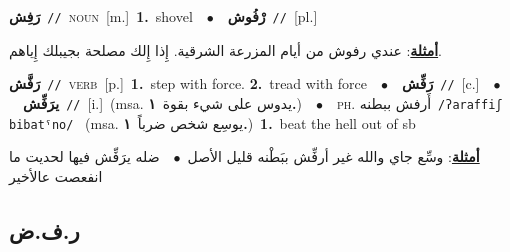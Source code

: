 \documentclass[10pt,a4paper,twoside]{article} %
\begin{document}
\begin{multicols}{2}
{\setlength\topsep{0pt}\textbf{\foreignlanguage{arabic}{رَفِش}}\ {\color{gray}\texttt{//}\color{black}}\ \textsc{noun}\ [m.]\ \textbf{1.}~shovel\ \ $\bullet$\ \ \setlength\topsep{0pt}\textbf{\foreignlanguage{arabic}{رْفُوش}}\ {\color{gray}\texttt{//}\color{black}}\ [pl.]\  \begin{flushright}\color{gray}\foreignlanguage{arabic}{\textbf{\underline{\foreignlanguage{arabic}{أمثلة}}}: عندي رفوش من أيام المزرعة الشرقية. إِذا إِلك مصلحة بجيبلك إِياهم.}\end{flushright}\color{black}} \vspace{2mm}

{\setlength\topsep{0pt}\textbf{\foreignlanguage{arabic}{رَفَّش}}\ {\color{gray}\texttt{//}\color{black}}\ \textsc{verb}\ [p.]\ \textbf{1.}~step with force.  \textbf{2.}~tread with force\ \ $\bullet$\ \ \setlength\topsep{0pt}\textbf{\foreignlanguage{arabic}{رَفِّش}}\ {\color{gray}\texttt{//}\color{black}}\ [c.]\ \ $\bullet$\ \ \setlength\topsep{0pt}\textbf{\foreignlanguage{arabic}{يرَفِّش}}\ {\color{gray}\texttt{//}\color{black}}\ [i.]\ \color{gray}(msa. \foreignlanguage{arabic}{يدوس على شيء بقوة}~\foreignlanguage{arabic}{\textbf{١.}})\color{black}\ \ $\bullet$\ \ \textsc{ph.} \color{gray} \foreignlanguage{arabic}{أَرفش ببطنه}\color{black}\ {\color{gray}\texttt{/{\sffamily ʔaraffiʃ bibatˤno}/}\color{black}}\ \color{gray} (msa. \foreignlanguage{arabic}{يوسِع شخص ضرباً}~\foreignlanguage{arabic}{\textbf{١.}})\color{black}\ \textbf{1.}~beat the hell out of sb\  \begin{flushright}\color{gray}\foreignlanguage{arabic}{\textbf{\underline{\foreignlanguage{arabic}{أمثلة}}}: وسِّع جاي والله غير أرفِّش ببَطْنه قليل الأصل\ $\bullet$\ \  ضله يرَفِّش فيها لحديت ما انفعصت عالأخير}\end{flushright}\color{black}} \vspace{2mm}

\vspace{-3mm}
\subsection*{\color{blue}\foreignlanguage{arabic}{ر.ف.ض}\color{blue}{}} 


\end{multicols}
\end{document}
